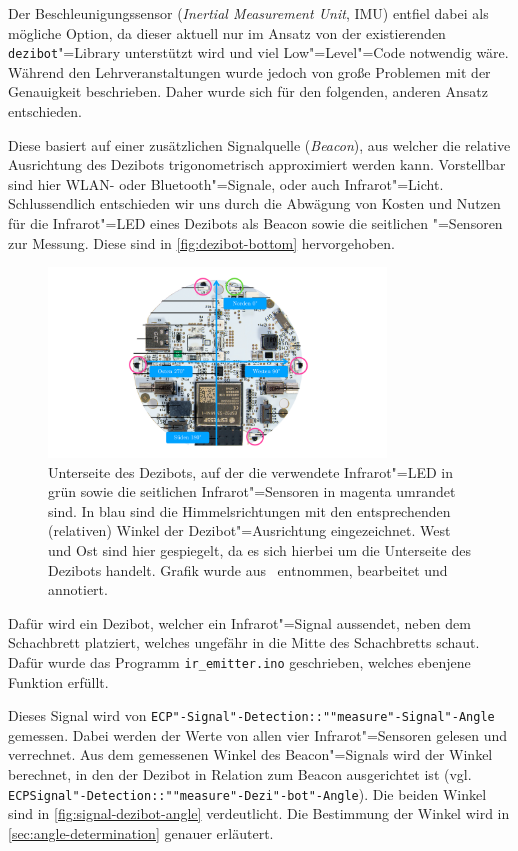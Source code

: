 Der Beschleunigungssensor (\emph{Inertial Measurement Unit}, IMU) entfiel dabei als mögliche Option, da dieser aktuell nur im Ansatz von der existierenden \texttt{dezibot}"=Library unterstützt wird und viel Low"=Level"=Code notwendig wäre. Während den Lehrveranstaltungen wurde jedoch von große Problemen mit der Genauigkeit beschrieben. Daher wurde sich für den folgenden, anderen Ansatz entschieden.

Diese basiert auf einer zusätzlichen Signalquelle (\emph{Beacon}), aus welcher die relative Ausrichtung des Dezibots trigonometrisch approximiert werden kann. Vorstellbar sind hier WLAN- oder Bluetooth"=Signale, oder auch Infrarot"=Licht. Schlussendlich entschieden wir uns durch die Abwägung von Kosten und Nutzen für die Infrarot"=LED eines Dezibots als Beacon sowie die seitlichen "=Sensoren zur Messung. Diese sind in \autoref{fig:dezibot-bottom} hervorgehoben.

\begin{figure}[h]
    \centering
    \includegraphics[width=0.8\textwidth]{../assets/dezibot_bottom.pdf}
    \caption{Unterseite des Dezibots, auf der die verwendete Infrarot"=LED in grün sowie die seitlichen Infrarot"=Sensoren in magenta umrandet sind. In blau sind die Himmelsrichtungen mit den entsprechenden (relativen) Winkel der Dezibot"=Ausrichtung eingezeichnet. West und Ost sind hier gespiegelt, da es sich hierbei um die Unterseite des Dezibots handelt. Grafik wurde aus~\cite{fingerleDokumentationDezibot42025} entnommen, bearbeitet und annotiert.}
    \label{fig:dezibot-bottom}
\end{figure}

Dafür wird ein Dezibot, welcher ein Infrarot"=Signal aussendet, neben dem Schachbrett platziert, welches ungefähr in die Mitte des Schachbretts schaut. Dafür wurde das Programm \texttt{ir\_emitter.ino} geschrieben, welches ebenjene Funktion erfüllt.

Dieses Signal wird von \texttt{ECP"-Signal"-Detection::""measure"-Signal"-Angle} gemessen. Dabei werden der Werte von allen vier Infrarot"=Sensoren gelesen und verrechnet. Aus dem gemessenen Winkel des Beacon"=Signals wird der Winkel berechnet, in den der Dezibot in Relation zum Beacon ausgerichtet ist (vgl. \texttt{ECPSignal"-Detection::""measure"-Dezi"-bot"-Angle}). Die beiden Winkel sind in \autoref{fig:signal-dezibot-angle} verdeutlicht. Die Bestimmung der Winkel wird in \autoref{sec:angle-determination} genauer erläutert.


